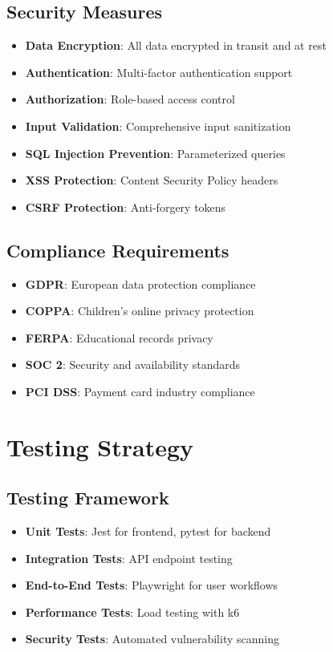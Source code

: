 \documentclass[11pt,a4paper]{article}
\begin{document}
\subsection{Security Measures}
\begin{itemize}
    \item \textbf{Data Encryption}: All data encrypted in transit and at rest
    \item \textbf{Authentication}: Multi-factor authentication support
    \item \textbf{Authorization}: Role-based access control
    \item \textbf{Input Validation}: Comprehensive input sanitization
    \item \textbf{SQL Injection Prevention}: Parameterized queries
    \item \textbf{XSS Protection}: Content Security Policy headers
    \item \textbf{CSRF Protection}: Anti-forgery tokens
\end{itemize}

\subsection{Compliance Requirements}
\begin{itemize}
    \item \textbf{GDPR}: European data protection compliance
    \item \textbf{COPPA}: Children's online privacy protection
    \item \textbf{FERPA}: Educational records privacy
    \item \textbf{SOC 2}: Security and availability standards
    \item \textbf{PCI DSS}: Payment card industry compliance
\end{itemize}

\section{Testing Strategy}

\subsection{Testing Framework}
\begin{itemize}
    \item \textbf{Unit Tests}: Jest for frontend, pytest for backend
    \item \textbf{Integration Tests}: API endpoint testing
    \item \textbf{End-to-End Tests}: Playwright for user workflows
    \item \textbf{Performance Tests}: Load testing with k6
    \item \textbf{Security Tests}: Automated vulnerability scanning
\end{itemize}
\end{document}

